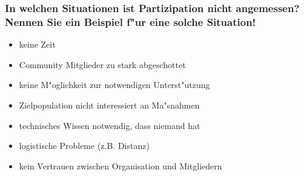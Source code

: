 \subsubsection{In welchen Situationen ist Partizipation nicht angemessen? Nennen Sie ein Beispiel f"ur eine solche Situation!}
\begin{itemize}
        \item keine Zeit
        \item Community Mitglieder zu stark abgeschottet
        \item keine M"oglichkeit zur notwendigen Unterst"utzung
        \item Zielpopulation nicht interessiert an Ma"snahmen
        \item technisches Wissen notwendig, dass niemand hat
        \item logistische Probleme (z.B. Distanz)
        \item kein Vertrauen zwischen Organisation und Mitgliedern
\end{itemize}


